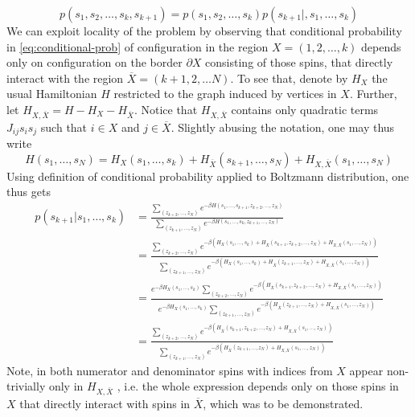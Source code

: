 \begin{equation}
  \label{eq:conditional-prob}
  p(s_1, s_2, \ldots, s_k, s_{k+1}) = p(s_1, s_2, \ldots, s_k)p(s_{k+1}|, s_1, \ldots, s_k)
\end{equation}
We can exploit locality of the problem by observing that conditional
probability in \eqref{eq:conditional-prob} of configuration in the region $X =
  (1, 2, \ldots, k)$ depends only on configuration on the border $\partial X$ consisting of those spins, that directly interact with the region
$\overline{X} = (k+1, 2, \ldots N)$. To see that, denote by $H_X$ the usual
Hamiltonian $H$ restricted to the graph induced by vertices in $X$. Further,
let $H_{X, \overline{X}} = H - H_X - H_{\overline{X}}$. Notice that $H_{X,
    \overline{X}}$ contains only quadratic terms $J_{ij} s_i s_j$ such that $i \in
  X$ and $j \in \overline{X}$. Slightly abusing the notation, one may thus write
\begin{equation}
  H(s_1, \ldots, s_N) = H_X(s_1, \ldots, s_k) + H_{\overline{X}}(s_{k+1}, \ldots, s_N) + H_{X, \overline{X}}(s_1, \ldots, s_N)
\end{equation}
Using definition of conditional probability applied to Boltzmann distribution,
one thus gets
\begin{align}
  p(s_{k+1}|s_1, \ldots, s_k) & = \frac{\sum\limits_{(z_{k+2}, \ldots, z_N)}e^{-\beta H(s_1, \ldots, s_{k+1}, z_{k+2},\ldots,z_N)}}{\sum\limits_{(z_{k+1}, \ldots, z_N)}e^{-\beta H(s_1, \ldots, s_k, z_{k+1},\ldots,z_N)}}                                                                                                                                                     \\
                              & = \frac{\sum\limits_{(z_{k+2}, \ldots, z_N)}e^{-\beta (H_X(s_1, \ldots, s_k) + H_{\overline{X}}(s_{k+1}, z_{k+2},\ldots,z_N) + H_{X, \overline{X}}(s_1, \ldots, z_N))}}{\sum\limits_{(z_{k+1}, \ldots, z_N)}e^{-\beta (H_X(s_1, \ldots, s_k) + H_{\overline{X}}(z_{k+1}, \ldots,z_N) + H_{X, \overline{X}}(s_1, \ldots, z_N))}}                 \\
                              & = \frac{e^{-\beta H_X(s_1, \ldots, s_k)}\sum\limits_{(z_{k+2}, \ldots, z_N)} e^{-\beta(H_{\overline{X}}(s_{k+1}, z_{k+2},\ldots,z_N) + H_{X, \overline{X}}(s_1, \ldots, z_N))}}{e^{-\beta H_X(s_1, \ldots, s_k)}\sum\limits_{(z_{k+1}, \ldots, z_N)}e^{ -\beta(H_{\overline{X}}(z_{k+1}, \ldots,z_N) + H_{X, \overline{X}}(s_1, \ldots, z_N))}} \\
                              & = \frac{\sum\limits_{(z_{k+2}, \ldots, z_N)} e^{-\beta(H_{\overline{X}}(s_{k+1}, z_{k+2},\ldots,z_N) + H_{X, \overline{X}}(s_1, \ldots, z_N))}}{\sum\limits_{(z_{k+1}, \ldots, z_N)}e^{ -\beta(H_{\overline{X}}(z_{k+1}, \ldots,z_N) + H_{X, \overline{X}}(s_1, \ldots, z_N))}}
\end{align}
Note, in both numerator and denominator spins with indices from $X$ appear
non-trivially only in $H_{X, \overline{X}}$ , i.e. the whole expression depends
only on those spins in $X$ that directly interact with spins in $\overline{X}$,
which was to be demonstrated.

